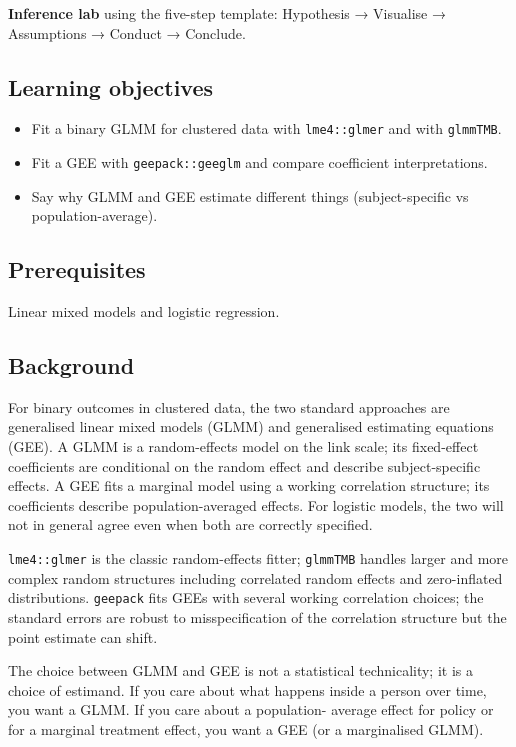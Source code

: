 \documentclass[
]{article}
\author{}
\date{\vspace{-2.5em}}
\providecommand{\tightlist}{%
  \setlength{\itemsep}{0pt}\setlength{\parskip}{0pt}}
\begin{document}
\textbf{Inference lab} using the five-step template: Hypothesis →
Visualise → Assumptions → Conduct → Conclude.

\subsection{Learning objectives}\label{learning-objectives}

\begin{itemize}
\tightlist
\item
  Fit a binary GLMM for clustered data with \texttt{lme4::glmer} and
  with \texttt{glmmTMB}.
\item
  Fit a GEE with \texttt{geepack::geeglm} and compare coefficient
  interpretations.
\item
  Say why GLMM and GEE estimate different things (subject-specific vs
  population-average).
\end{itemize}

\subsection{Prerequisites}\label{prerequisites}

Linear mixed models and logistic regression.

\subsection{Background}\label{background}

For binary outcomes in clustered data, the two standard approaches are
generalised linear mixed models (GLMM) and generalised estimating
equations (GEE). A GLMM is a random-effects model on the link scale; its
fixed-effect coefficients are conditional on the random effect and
describe subject-specific effects. A GEE fits a marginal model using a
working correlation structure; its coefficients describe
population-averaged effects. For logistic models, the two will not in
general agree even when both are correctly specified.

\texttt{lme4::glmer} is the classic random-effects fitter;
\texttt{glmmTMB} handles larger and more complex random structures
including correlated random effects and zero-inflated distributions.
\texttt{geepack} fits GEEs with several working correlation choices; the
standard errors are robust to misspecification of the correlation
structure but the point estimate can shift.

The choice between GLMM and GEE is not a statistical technicality; it is
a choice of estimand. If you care about what happens inside a person
over time, you want a GLMM. If you care about a population- average
effect for policy or for a marginal treatment effect, you want a GEE (or
a marginalised GLMM).
\end{document}
